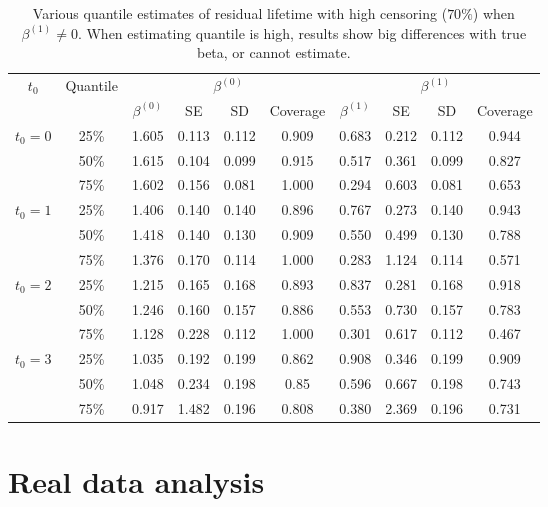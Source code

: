 \documentclass[titlepage,english,12pt]{article}
\begin{document}
	\begin{table}[H] \label{table:8}
		\caption{Various quantile estimates of residual lifetime with high censoring ($70\%$) when $\beta^{(1)} \neq 0$. When estimating quantile is high, results show big differences with true beta, or cannot estimate.}
		\centering
		\begin{tabular}{|c|c|c|c|c|c|c|c|c|c|}
			\hline
			\multirow{2}{*}{$t_0$} & \multirow{2}{*}{Quantile} & \multicolumn{4}{c|}{$\beta^{(0)}$} & \multicolumn{4}{c|}{$\beta^{(1)}$}\\ \cline{3-10}
			& & $\beta^{(0)}$ & SE & SD  & Coverage  & $\beta^{(1)}$ & SE & SD & Coverage\\
			\hline\hline
			\multirow{3}{*}{$t_0=0$} & 25\% & 1.605 & 0.113 & 0.112 & 0.909 & 0.683 & 0.212 & 0.112 & 0.944 \\ 
			& 50\% & 1.615 & 0.104 & 0.099 & 0.915 & 0.517 & 0.361 & 0.099 & 0.827 \\  
			& 75\% & 1.602 & 0.156 & 0.081 & 1.000 & 0.294 & 0.603 & 0.081 & 0.653 \\
			\hline
			\multirow{3}{*}{$t_0=1$} & 25\% & 1.406 & 0.140 & 0.140 & 0.896 & 0.767 & 0.273 & 0.140 & 0.943 \\
			& 50\% & 1.418 & 0.140 & 0.130 & 0.909 & 0.550 & 0.499 & 0.130 & 0.788 \\
			& 75\% & 1.376 & 0.170 & 0.114 & 1.000 & 0.283 & 1.124 & 0.114 & 0.571 \\ 
			\hline
			\multirow{3}{*}{$t_0=2$} & 25\% & 1.215 & 0.165 & 0.168 & 0.893 & 0.837 & 0.281 & 0.168 & 0.918 \\
			& 50\% & 1.246 & 0.160 & 0.157 & 0.886 & 0.553 & 0.730 & 0.157 & 0.783 \\ 
			& 75\% & 1.128 & 0.228 & 0.112 & 1.000 & 0.301 & 0.617 & 0.112 & 0.467 \\ 
			\hline
			\multirow{3}{*}{$t_0=3$} & 25\% & 1.035 & 0.192 & 0.199 & 0.862 & 0.908 & 0.346 & 0.199 & 0.909 \\
			& 50\% & 1.048 & 0.234 & 0.198 & 0.85 & 0.596 & 0.667 & 0.198 & 0.743 \\
			& 75\% & 0.917 & 1.482 & 0.196 & 0.808 & 0.380 & 2.369 & 0.196 & 0.731 \\ 
			\hline
		\end{tabular}
	\end{table}


\section{Real data analysis}
\end{document}
